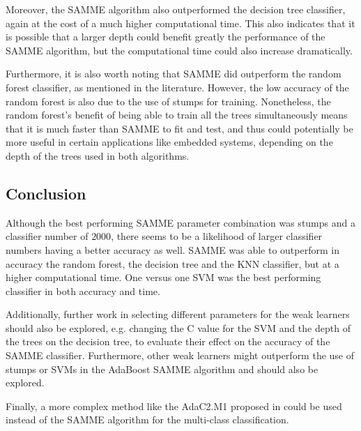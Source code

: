 \documentclass{article}
\begin{document}
Moreover, the SAMME algorithm also outperformed the decision tree classifier, again at the cost of a much higher computational time. This also indicates that it is possible that a larger depth could benefit greatly the performance of the SAMME algorithm, but the computational time could also increase dramatically.

Furthermore, it is also worth noting that SAMME did outperform the random forest classifier, as mentioned in the literature. However, the low accuracy of the random forest is also due to the use of stumps for training. Nonetheless, the random forest's benefit of being able to train all the trees simultaneously means that it is much faster than SAMME to fit and test, and thus could potentially be more useful in certain applications like embedded systems, depending on the depth of the trees used in both algorithms.

\subsection{Conclusion}
Although the best performing SAMME parameter combination was stumps and a classifier number of $2000$, there seems to be a likelihood of larger classifier numbers having a better accuracy as well. SAMME was able to outperform in accuracy the random forest, the decision tree and the KNN classifier, but at a higher computational time. One versus one SVM was the best performing classifier in both accuracy and time.

Additionally, further work in selecting different parameters for the weak learners should also be explored, e.g. changing the C value for the SVM and the depth of the trees on the decision tree, to evaluate their effect on the accuracy of the SAMME classifier. Furthermore, other weak learners might outperform the use of stumps or SVMs in the AdaBoost SAMME algorithm and should also be explored.

Finally, a more complex method like the AdaC2.M1 proposed in \cite{Sun_multiclass_inbalanced_AdaC2.M1} could be used instead of the SAMME algorithm for the multi-class classification.



\end{document}
